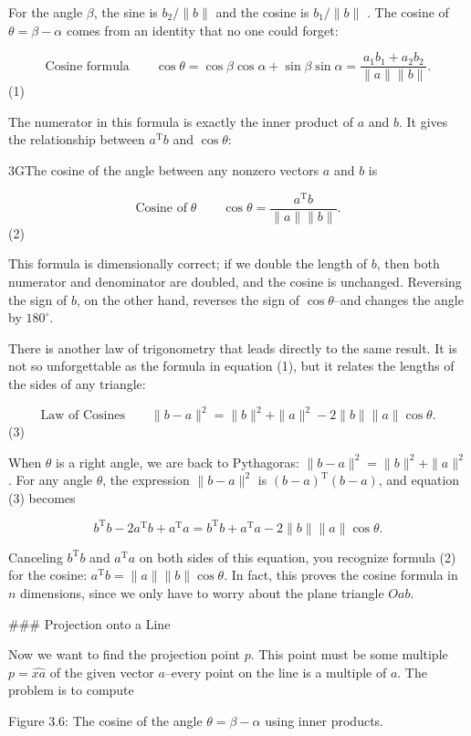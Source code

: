 For the angle \(\beta\), the sine is \(b_{2}/\|b\|\) and the cosine is \(b_{1}/\|b\|\) . The cosine of \(\theta=\beta-\alpha\) comes from an identity that no one could forget:

\[\text{{Cosine formula}}\qquad\cos\theta=\cos\beta\cos\alpha+\sin\beta\sin \alpha=\frac{a_{1}b_{1}+a_{2}b_{2}}{\|a\|\|b\|}.\] (1)

The numerator in this formula is exactly the inner product of \(a\) and \(b\). It gives the relationship between \(a^{\mathrm{T}}b\) and \(\cos\theta\):

3GThe cosine of the angle between any nonzero vectors \(a\) and \(b\) is

\[\text{{Cosine of}}\;\theta\qquad\cos\theta=\frac{a^{\mathrm{T}}b}{\|a\|\|b\|}.\] (2)

This formula is dimensionally correct; if we double the length of \(b\), then both numerator and denominator are doubled, and the cosine is unchanged. Reversing the sign of \(b\), on the other hand, reverses the sign of \(\cos\theta\)--and changes the angle by \(180^{\circ}\).

There is another law of trigonometry that leads directly to the same result. It is not so unforgettable as the formula in equation (1), but it relates the lengths of the sides of any triangle:

\[\text{{Law of Cosines}}\qquad\|b-a\|^{2}=\|b\|^{2}+\|a\|^{2}-2\|b\|\|a\|\cos\theta.\] (3)

When \(\theta\) is a right angle, we are back to Pythagoras: \(\|b-a\|^{2}=\|b\|^{2}+\|a\|^{2}\). For any angle \(\theta\), the expression \(\|b-a\|^{2}\) is \((b-a)^{\mathrm{T}}(b-a)\), and equation (3) becomes

\[b^{\mathrm{T}}b-2a^{\mathrm{T}}b+a^{\mathrm{T}}a=b^{\mathrm{T}}b+a^{\mathrm{T }}a-2\|b\|\|a\|\cos\theta.\]

Canceling \(b^{\mathrm{T}}b\) and \(a^{\mathrm{T}}a\) on both sides of this equation, you recognize formula (2) for the cosine: \(a^{\mathrm{T}}b=\|a\|\|b\|\cos\theta\). In fact, this proves the cosine formula in \(n\) dimensions, since we only have to worry about the plane triangle \(Oab\).

### Projection onto a Line

Now we want to find the projection point \(p\). This point must be some multiple \(p=\widehat{xa}\) of the given vector \(a\)--every point on the line is a multiple of \(a\). The problem is to compute

Figure 3.6: The cosine of the angle \(\theta=\beta-\alpha\) using inner products.

 